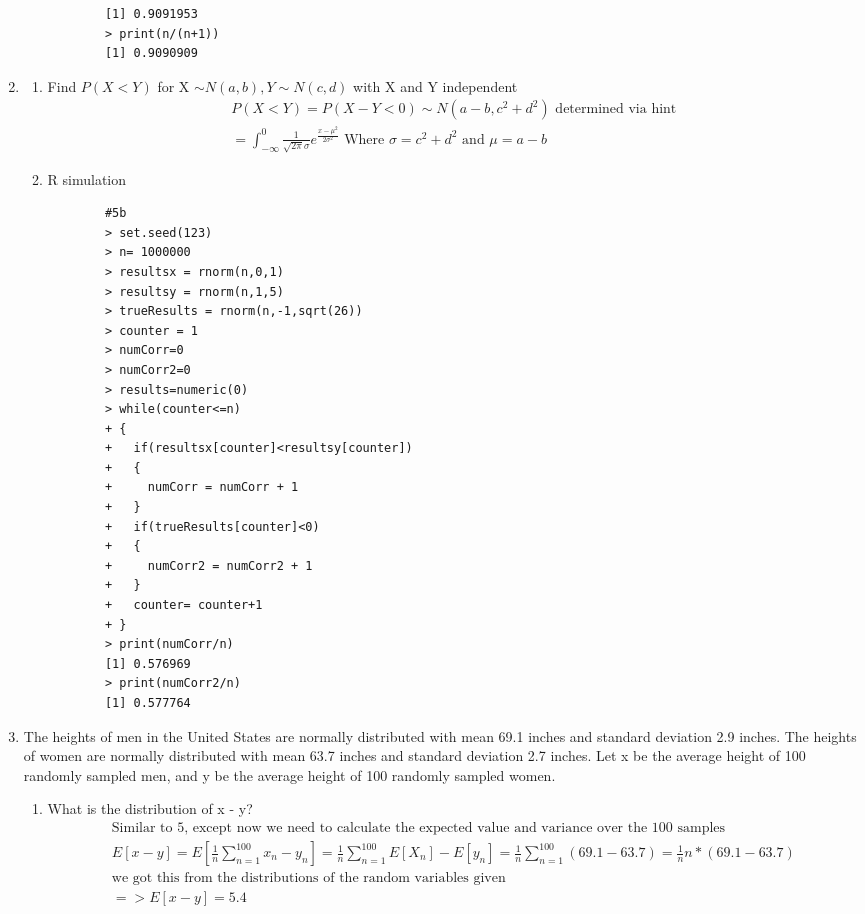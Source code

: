 \documentclass[11pt]{article}
\begin{document}
\begin{enumerate}
\begin{enumerate}
\begin{verbatim}
		[1] 0.9091953
		> print(n/(n+1))
		[1] 0.9090909
	\end{verbatim}
\end{enumerate}
\item 
\begin{enumerate}
	\item Find $P(X < Y)$ for X $\sim N(a, b), Y \sim N(c, d)$ with X and Y independent
	\begin{gather}
		P(X<Y) = P(X-Y < 0) \sim N(a-b,c^2 + d^2) \text{ determined via hint}\\
		= \int_{-\infty}^{0} \frac{1}{\sqrt{2\pi} \sigma} e ^ {\frac{{x-\mu}^2}{2\sigma ^2}} \text{ Where } \sigma = c^2 + d^2 \text{ and } \mu = a-b
	\end{gather}
	\item R simulation
	\begin{verbatim}
		#5b
		> set.seed(123)
		> n= 1000000
		> resultsx = rnorm(n,0,1)
		> resultsy = rnorm(n,1,5)
		> trueResults = rnorm(n,-1,sqrt(26))
		> counter = 1
		> numCorr=0
		> numCorr2=0
		> results=numeric(0) 
		> while(counter<=n)
		+ {
		+   if(resultsx[counter]<resultsy[counter])
		+   {
		+     numCorr = numCorr + 1
		+   }
		+   if(trueResults[counter]<0)
		+   {
		+     numCorr2 = numCorr2 + 1
		+   }
		+   counter= counter+1
		+ }
		> print(numCorr/n)
		[1] 0.576969
		> print(numCorr2/n)
		[1] 0.577764
	\end{verbatim}
\end{enumerate}
\item The heights of men in the United States are normally distributed with mean 69.1 inches and standard deviation
2.9 inches. The heights of women are normally distributed with mean 63.7 inches and standard deviation 2.7 inches. Let x be the average height of 100 randomly sampled men, and y be the average height
of 100 randomly sampled women.
\begin{enumerate}
	\item What is the distribution of x - y?
	\begin{gather}
		\text{Similar to 5, except now we need to calculate the expected value and variance over the 100 samples}\\
		E[x-y] = E[\frac{1}{n}\sum_{n=1}^{100} x_n-y_n] =\frac{1}{n}\sum_{n=1}^{100} E[X_n] - E[y_n] =\frac{1}{n}\sum_{n=1}^{100} (69.1-63.7) = \frac{1}{n} n*(69.1-63.7) \\
		\text{we got this from the distributions of the random variables given}\\
		=> E[x-y] = 5.4\\

\end{gather}
\end{enumerate}
\end{enumerate}
\end{document}
